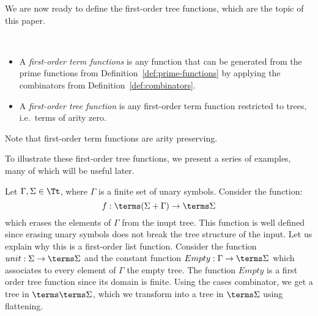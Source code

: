 We are now ready to define the first-order tree functions, which are the topic of this paper. 

\begin{definition} \label{def:fo-tree-functions} \ 
    \begin{itemize}
        \item A \emph{first-order term functions} is any function that can be  generated from the prime functions from Definition~\ref{def:prime-functions} by applying the  combinators from Definition~\ref{def:combinators}.
        \item  A \emph{first-order tree function} is any first-order term function restricted to trees, i.e.~terms of arity zero.
    \end{itemize}    
\end{definition}
Note that first-order term functions are arity preserving. 

To illustrate these first-order tree functions, we present a series of examples, many of which will be useful later.

\bigskip
%
%
\noindent\begin{example}[Filter] Let $\Gamma, \Sigma\in\Tt$, where $\Gamma$ is a finite set of unary symbols. Consider the function:
$$ f:\terms (\Sigma+\Gamma)\to\terms \Sigma$$
which erases the elements of $\Gamma$ from the inupt tree. This function is well defined since erasing unary symbols does not break the tree structure of the input. 
Let us explain why this is a first-order list function. 
Consider the function $unit:\Sigma\to\terms\Sigma$ and the constant function $Empty:\Gamma\to\terms\Sigma$ which associates to every element of $\Gamma$ the empty tree. The function $Empty$ is a first order tree function since its domain is finite. Using the cases combinator, we get a tree in $\terms\terms\Sigma$, which we transform into a tree in $\terms \Sigma$ using flattening.
\end{example}

